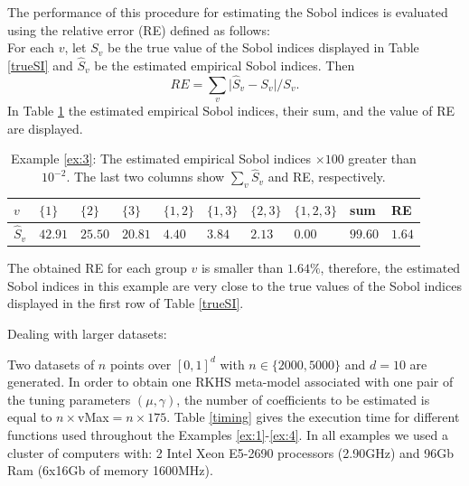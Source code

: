 \begin{itemize}
The performance of this procedure for estimating the Sobol indices is evaluated using the relative error (RE) defined as follows:\\
For each $v$, let $S_v$ be the true value of the Sobol indices displayed in Table \ref{trueSI} and $\widehat{S}_v$ be the estimated empirical Sobol indices. Then
\begin{equation}
\label{relerr}
RE=\sum_v{\vert\widehat{S}_v-S_v\vert/S_v}.
\end{equation}
In Table \ref{tab:SIex3} the estimated empirical Sobol indices, their sum, and the value of RE are displayed.  
\begin{table}[h!]
\centering
\small{
{\setlength{\tabcolsep}{4pt}
\begin{tabular}{l|lllllll|l|l} 
$v$    & $\{1\}$ & $\{2\}$ & $\{3\}$ & $\{1,2\}$ & $\{1,3\}$ & $\{2,3\}$ & $\{1,2,3\}$ & sum &RE \\ \hline
$\widehat{S}_v$   & $42.91$  & $25.50$  & $20.81$  & $4.40$ & $3.84$ & $2.13$ & $0.00$ & $99.60$ & $1.64$
\end{tabular}}}
\caption{Example \ref{ex:3}: The estimated empirical Sobol indices $\times100$ greater than $10^{-2}$. The last two columns show $\sum_v\widehat{S}_v$ and RE, respectively.}
\label{tab:SIex3}
\end{table} 
\end{itemize}
The obtained RE for each group $v$ is smaller than $1.64\%$, therefore, the estimated Sobol indices in this example are very close to the true values of the Sobol indices displayed in the first row of Table \ref{trueSI}. 
\begin{exemp}\label{ex:4}
Dealing with larger datasets:
\end{exemp} 
Two datasets of $n$ points  over $[0,1]^d$ with $n\in\{2000,5000\}$ and $d=10$ are generated.
In order to obtain one RKHS meta-model associated with one pair of the tuning parameters $(\mu,\gamma)$, the number of coefficients to be estimated is equal to $n\times$vMax$=n\times 175$. 
Table \ref{timing} gives the execution time for different functions used throughout the Examples \ref{ex:1}-\ref{ex:4}. In all examples we used a cluster of computers with: 2 Intel Xeon E5-2690 processors (2.90GHz) and 96Gb Ram (6x16Gb of memory 1600MHz). 
